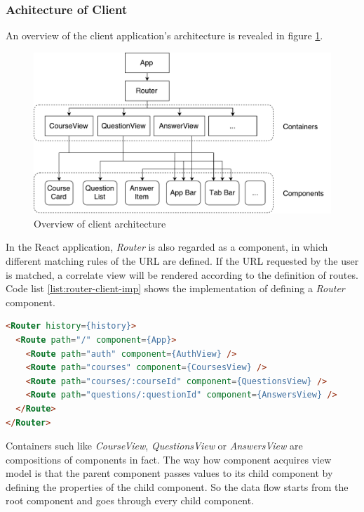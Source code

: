 \subsubsection{Achitecture of Client}

An overview of the client application's architecture is revealed in figure \ref{fig:client-arch-imp}. 

\begin{figure}[!htbp]
  \centering
    \includegraphics[width=1\textwidth]{Figures/imp-client-arch.pdf}
  \caption{Overview of client architecture}
  \label{fig:client-arch-imp}
\end{figure}

In the React application, \textit{Router} is also regarded  as a component, in which different matching rules of the URL are defined. If the URL requested by the user is matched, a correlate view will be rendered according to the definition of routes. Code list \ref{list:router-client-imp} shows the implementation of defining a \textit{Router} component.

\begin{lstlisting}[language=HTML, caption=Router in client app , label={list:router-client-imp}]
<Router history={history}>
  <Route path="/" component={App}>
    <Route path="auth" component={AuthView} />
    <Route path="courses" component={CoursesView} />
    <Route path="courses/:courseId" component={QuestionsView} />
    <Route path="questions/:questionId" component={AnswersView} />
  </Route>
</Router>
\end{lstlisting}

Containers such like \textit{CourseView}, \textit{QuestionsView} or \textit{AnswersView} are compositions of components in fact. The way how component acquires view model is that the parent component passes values to its child component by defining the properties of the child component. So the data flow starts from the root component and goes through every child component. 

